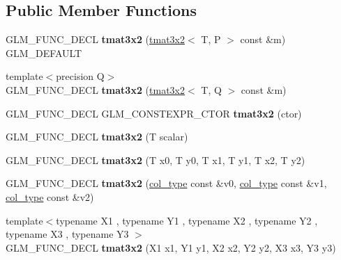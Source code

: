\subsection*{Public Member Functions}
\begin{DoxyCompactItemize}
\item 
\mbox{\label{structglm_1_1tmat3x2_a654f76d38f00d3c005a9bddb23200c2e}} 
G\+L\+M\+\_\+\+F\+U\+N\+C\+\_\+\+D\+E\+CL {\bfseries tmat3x2} (\hyperlink{structglm_1_1tmat3x2}{tmat3x2}$<$ T, P $>$ const \&m) G\+L\+M\+\_\+\+D\+E\+F\+A\+U\+LT
\item 
\mbox{\label{structglm_1_1tmat3x2_a238eaf8178ff26a8c6adb554790043ee}} 
{\footnotesize template$<$precision Q$>$ }\\G\+L\+M\+\_\+\+F\+U\+N\+C\+\_\+\+D\+E\+CL {\bfseries tmat3x2} (\hyperlink{structglm_1_1tmat3x2}{tmat3x2}$<$ T, Q $>$ const \&m)
\item 
\mbox{\label{structglm_1_1tmat3x2_a55c97bff59125b697080912cfa030b0e}} 
G\+L\+M\+\_\+\+F\+U\+N\+C\+\_\+\+D\+E\+CL G\+L\+M\+\_\+\+C\+O\+N\+S\+T\+E\+X\+P\+R\+\_\+\+C\+T\+OR {\bfseries tmat3x2} (ctor)
\item 
\mbox{\label{structglm_1_1tmat3x2_a874b837bb746cd36e0e98d7d692a29f2}} 
G\+L\+M\+\_\+\+F\+U\+N\+C\+\_\+\+D\+E\+CL {\bfseries tmat3x2} (T scalar)
\item 
\mbox{\label{structglm_1_1tmat3x2_a7fecf49cbc87b5fc10c41f17fc66f43f}} 
G\+L\+M\+\_\+\+F\+U\+N\+C\+\_\+\+D\+E\+CL {\bfseries tmat3x2} (T x0, T y0, T x1, T y1, T x2, T y2)
\item 
\mbox{\label{structglm_1_1tmat3x2_a59846d49680c29a955f14158d32f23b9}} 
G\+L\+M\+\_\+\+F\+U\+N\+C\+\_\+\+D\+E\+CL {\bfseries tmat3x2} (\hyperlink{structglm_1_1tvec2}{col\+\_\+type} const \&v0, \hyperlink{structglm_1_1tvec2}{col\+\_\+type} const \&v1, \hyperlink{structglm_1_1tvec2}{col\+\_\+type} const \&v2)
\item 
\mbox{\label{structglm_1_1tmat3x2_a11808723576eb33086d64fb1e1ad6105}} 
{\footnotesize template$<$typename X1 , typename Y1 , typename X2 , typename Y2 , typename X3 , typename Y3 $>$ }\\G\+L\+M\+\_\+\+F\+U\+N\+C\+\_\+\+D\+E\+CL {\bfseries tmat3x2} (X1 x1, Y1 y1, X2 x2, Y2 y2, X3 x3, Y3 y3)

\end{DoxyCompactItemize}
